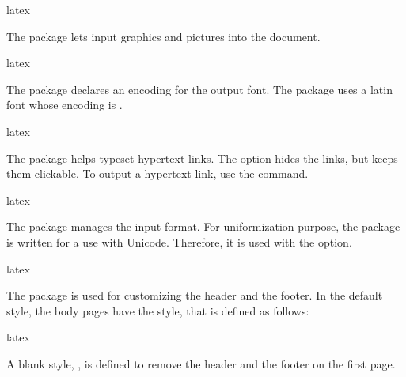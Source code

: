 \documentclass{report}
\begin{document}
\begin{imtaCode}{latex}
\RequirePackage[a4paper, margin=2cm, top=3cm]{geometry}
\end{imtaCode}


The  package lets input graphics and pictures into the document.

\begin{imtaCode}{latex}
\RequirePackage{graphicx}
\end{imtaCode}


The  package declares an encoding for the output font.
The  package uses a latin font whose encoding is .

\begin{imtaCode}{latex}
\RequirePackage[T1]{fontenc}
\end{imtaCode}


The  package helps typeset hypertext links.
The  option hides the links, but keeps them clickable.
To output a hypertext link, use the  command.

\begin{imtaCode}{latex}
\RequirePackage[hidelinks]{hyperref}
\end{imtaCode}


The  package manages the input format.
For uniformization purpose, the  package is written for a use with Unicode.
Therefore, it is used with the  option.

\begin{imtaCode}{latex}
\RequirePackage[utf8]{inputenc}
\end{imtaCode}


The  package is used for customizing the header and the footer.
In the default style, the body pages have the  style, that is defined as follows:

\begin{imtaCode}{latex}
\pagestyle{fancy}
\fancyhead{}
\fancyfoot{}
\fancyhead[L]{\thetitle}
\fancyhead[R]{\imtaTheAuthorShort}
\fancyfoot[C]{\thepage}
\end{imtaCode}

A blank style, , is defined to remove the header and the footer on the first page.
\end{document}
